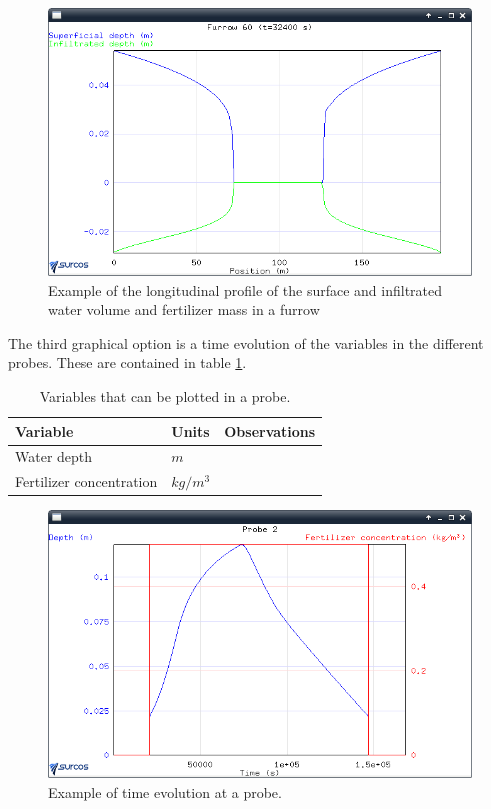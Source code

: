 \begin{figure}[!h]
\begin{center}
\includegraphics*[width=\textwidth]{images/evoSurcoEN.png}
\qquad
\caption{Example of the longitudinal profile of the surface and infiltrated water volume and fertilizer mass in a furrow}\label{evo2}
\end{center}
\end{figure}

The third graphical option is a time evolution of the variables in the different probes. These are contained in table \ref{tableVariables3}.

\begin{table}[h]\footnotesize
\begin{center}
\begin{tabular}{llr}
\hline
Variable & Units & Observations \\
\hline
Water depth & $m$ \\
Fertilizer concentration & $ kg/m^3 $\\
\hline
\end{tabular}
\end{center}
  \caption{Variables that can be plotted in a probe.}\label{tableVariables3}
\end{table}

\begin{figure}[!h]
\begin{center}
\includegraphics*[width=\textwidth]{images/evoSondaEN.png}
\qquad
\caption{Example of time evolution at a probe.}\label{evo3}
\end{center}
\end{figure}


